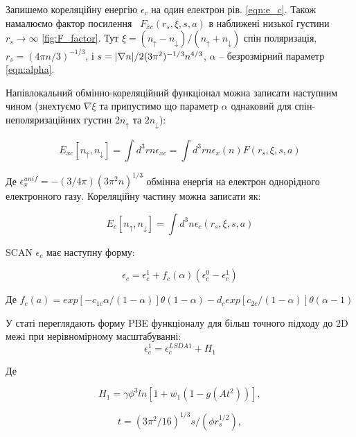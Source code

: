 Запишемо кореляційну енергію $\epsilon_c$ на один електрон рів. \ref{eqn:e_c}. Також намалюємо фактор посилення \ $F_{xc}(r_s, \xi, s, a)$ в наближені низької густини $r_s \rightarrow \infty$ \ref{fig:F_factor}. Тут $\xi = (n_\uparrow - n_\downarrow)/(n_\uparrow + n_\downarrow)$ спін поляризація, $r_s = (4 \pi n/3)^{-1/3}$, і $s = {|\nabla{n}|}/{2(3\pi^2)^{-1/3}
\\ n^{4/3}}$, $\alpha$ -- безрозмірний параметр \ref{eqn:alpha}. 

Напівлокальний обмінно-кореляційний функціонал можна записати наступним чином (знехтуємо $\nabla \xi$ та припустимо що параметр $\alpha$ однаковий для спін-неполяризаційних густин $2n_\uparrow$ та $2n_\downarrow$):

\begin{equation}
	\label{eqn:semilocalexc}
	E_{xc}[n_{\uparrow},n_{\downarrow}] = \int{d^3 r n\epsilon_{xc} = \int d^3 r n \epsilon_{x}(n)F(r_s,\xi, s, a)}
\end{equation}

Де $\epsilon_x^{unif} = -(3/4\pi)(3\pi^2n)^{1/3}$ обмінна енергія на електрон однорідного електронного газу.  
Кореляційну частину можна записати як: 

\begin{equation}
	\label{eqn:cor}
	E_{c}[n_{\uparrow},n_{\downarrow}] = \int{d^3 n \epsilon_c (r_s,\xi, s, a)}
\end{equation}

SCAN $\epsilon_c$ має наступну форму:

\begin{equation}
	\label{eqn:e_c}
	\epsilon_c = \epsilon_c^1 + f_c(\alpha)(\epsilon_c^0 -\epsilon_c^1)
\end{equation}

Де $f_c(a) = exp[-c_{1c}\alpha/(1-\alpha)]\theta(1-\alpha)-d_c exp[c_{2c}/(1-\alpha)]\theta(\alpha-1)$

У статі \cite{SCAN} переглядають форму PBE функціоналу для більш точного підходу до 2D межі при нерівномірному масштабуванні: 
\begin{equation}
	\epsilon_c^1 = \epsilon_c^{LSDA1}+H_1
\end{equation}

Де

\begin{equation}
	\label{eqn:H_1}
	H_1 = \gamma\phi^3ln[1+w_1(1-g(At^2))],
\end{equation}

\begin{equation}
	t = (3\pi^2/16)^{1/3}s/(\phi r_s^{1/2}),
\end{equation}

